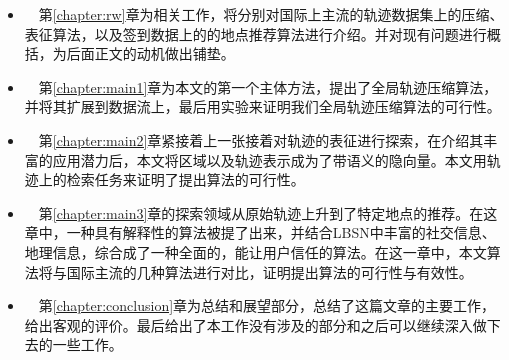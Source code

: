 \vspace{2mm}
\begin{itemize}
  \item ~~第\ref{chapter:rw}章为相关工作，将分别对国际上主流的轨迹数据集上的压缩、表征算法，以及签到数据上的的地点推荐算法进行介绍。并对现有问题进行概括，为后面正文的动机做出铺垫。
  \vspace{1mm}
  \item ~~第\ref{chapter:main1}章为本文的第一个主体方法，提出了全局轨迹压缩算法，并将其扩展到数据流上，最后用实验来证明我们全局轨迹压缩算法的可行性。
  \vspace{1mm}
  \item ~~第\ref{chapter:main2}章紧接着上一张接着对轨迹的表征进行探索，在介绍其丰富的应用潜力后，本文将区域以及轨迹表示成为了带语义的隐向量。本文用轨迹上的检索任务来证明了提出算法的可行性。
  \vspace{1mm}
  \item ~~第\ref{chapter:main3}章的探索领域从原始轨迹上升到了特定地点的推荐。在这章中，一种具有解释性的算法被提了出来，并结合LBSN中丰富的社交信息、地理信息，综合成了一种全面的，能让用户信任的算法。在这一章中，本文算法将与国际主流的几种算法进行对比，证明提出算法的可行性与有效性。
  \vspace{1mm}
  \item ~~第\ref{chapter:conclusion}章为总结和展望部分，总结了这篇文章的主要工作，给出客观的评价。最后给出了本工作没有涉及的部分和之后可以继续深入做下去的一些工作。
\end{itemize}

